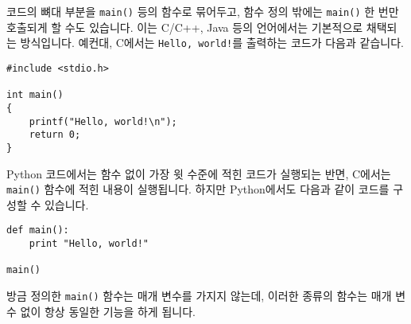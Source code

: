 \documentclass[../main.tex]{subfiles}
\begin{document}
코드의 뼈대 부분을 \texttt{main()} 등의 함수로 묶어두고, 함수 정의 밖에는 \texttt{main()} 한 번만 호출되게 할 수도 있습니다.
이는 C/C++, Java 등의 언어에서는 기본적으로 채택되는 방식입니다.
예컨대, C에서는 \texttt{Hello, world!}를 출력하는 코드가 다음과 같습니다.
\begin{verbatim}
#include <stdio.h>

int main()
{
	printf("Hello, world!\n");
	return 0;
}
\end{verbatim}
Python 코드에서는 함수 없이 가장 윗 수준에 적힌 코드가 실행되는 반면, C에서는 \texttt{main()} 함수에 적힌 내용이 실행됩니다.
하지만 Python에서도 다음과 같이 코드를 구성할 수 있습니다.
\begin{verbatim}
def main():
	print "Hello, world!"

main()
\end{verbatim}
방금 정의한 \texttt{main()} 함수는 매개 변수를 가지지 않는데, 이러한 종류의 함수는 매개 변수 없이 항상 동일한 기능을 하게 됩니다.
\end{document}
